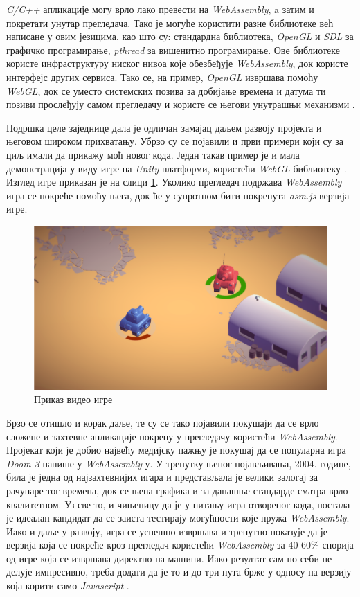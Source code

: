 \documentclass[12pt,oneside]{memoir}
\begin{document}
\textit{C/C++} апликације могу врло лако превести на \textit{WebAssembly}, a затим и покретати унутар прегледача.
Тако је могуће користити разне библиотеке већ написане у овим језицима, као што су: стандардна библиотека, \textit{OpenGL} и
\textit{SDL} за графичко програмирање, \textit{pthread} за вишенитно програмирање. Ове библиотеке користе инфраструктуру ниског
нивоа које обезбеђује \textit{WebAssembly}, док користе интерфејс других сервиса. Тако се, на пример, \textit{OpenGL} извршава помоћу
\textit{WebGL}, док се уместо системских позива за добијање времена и датума ти позиви прослеђују самом прегледачу и користе се његови
унутрашњи механизми \cite{WASMC++}.

Подршка целе заједнице дала је одличан замајац даљем развоју пројекта и његовом широком прихватању. Убрзо су се појавили и први примери
који су за циљ имали да прикажу моћ новог кода. Један такав пример је и мала демонстрација у виду игре на \textit{Unity} платформи, користећи \textit{WebGL}
библиотеку \cite{GAME}. Изглед игре приказан је на слици \ref{img:TANKS}. Уколико прегледач подржава \textit{WebAssembly} игра се покреће помоћу њега, док ће
у супротном бити покренута \textit{asm.js} верзија игре.

\begin{figure}
\begin{center}
\includegraphics[scale=0.2]{tanks_demo}
\caption{Приказ видео игре}
\label{img:TANKS}
\end{center}
\end{figure}

Брзо се отишло и корак даље, те су се тако појавили покушаји да се врло сложене и захтевне апликације покрену у прегледачу користећи \textit{WebAssembly}.
Пројекат који је добио највећу медијску пажњу је покушај да се популарна игра \textit{Doom 3} напише у \textit{WebAssembly}-у. У тренутку њеног појављивања,
2004. године, била је једна од најзахтевнијих игара и представљала је велики залогај за рачунаре тог времена, док се њена графика и за данашње стандарде сматра
врло квалитетном. Уз све то, и чињеницу да је у питању игра отвореног кода, постала је идеалан кандидат да се заиста тестирају могућности које пружа \textit{WebAssembly}.
Иако и даље у развоју, игра се успешно извршава и тренутно показује да је верзија која се покреће кроз прегледач користећи \textit{WebAssembly} за 40-60\% спорија од игре
која се извршава директно на машини. Иако резултат сам по себи не делује импресивно, треба додати да је то и до три пута брже у односу на верзију која корити само
\textit{Javascript} \cite{D3WASM}.
\end{document}
